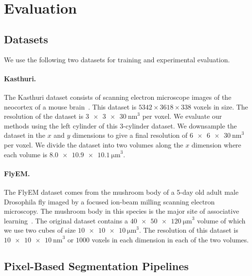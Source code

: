 \section{Evaluation}

\subsection{Datasets}
\label{sec:dataset}

We use the following two datasets for training and experimental evaluation.

\paragraph{\bf Kasthuri.}
The Kasthuri dataset consists of scanning electron microscope images of the neocortex of a mouse brain~\cite{kasthuri2015saturated}. This dataset is $5342 \times 3618 \times 338$ voxels in size. The resolution of the dataset is $\SI[product-units=single]{3 x 3 x 30}{\nano\meter}^3$ per voxel. We evaluate our methods using the left cylinder of this 3-cylinder dataset. We downsample the dataset in the $x$ and $y$ dimensions to give a final resolution of $\SI[product-units=single]{6 x 6 x 30}{\nano\meter}^3$ per voxel. We divide the dataset into two volumes along the $x$ dimension where each volume is $\SI[product-units=single]{8.0 x 10.9 x 10.1}{\micro\meter}^3$.

\paragraph{\bf FlyEM.}
The FlyEM dataset comes from the mushroom body of a 5-day old adult male Drosophila fly imaged by a focused ion-beam milling scanning electron microscopy.  The mushroom body in this species is the major site of associative learning~\cite{takemura2017connectome}. The original dataset contains a $\SI[product-units=single]{40 x 50 x 120}{\micro\meter}^3$ volume of which we use two cubes of size $\SI[product-units=single]{10 x 10 x 10}{\micro\meter}^3$. The resolution of this dataset is $\SI[product-units=single]{10 x 10 x 10}{\nano\meter}^3$ or $1000$ voxels in each dimension in each of the two volumes.

\subsection{Pixel-Based Segmentation Pipelines}
\label{sec:neuroproof}

